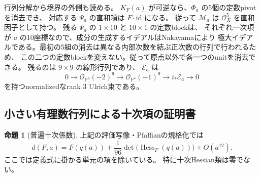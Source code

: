 \documentclass[a4paper,11pt]{ltjsarticle}
\theoremstyle{definition}
\newtheorem{theorem}{命題}[section]
\newcommand{\OO}{\mathcal O}
\newcommand{\PP}{\mathbb P}
\begin{document}
行列分解から境界の外側も読める。
$K_F(a)$ が可逆なら、$\Phi_a$ の5個の定数pivotを消去でき、
対応する $\Psi_a$ の直和項は $F\cdot\mathrm{id}$ になる。
従って $\mathcal M_a$ は $\OO_X^5$ を直和因子として持つ。
残る $\Psi_a$ の $1\times10$ と $10\times1$ の定数blockは、
それぞれ一次項が $a$ の10座標なので、成分の生成するイデアルはNakayamaにより
極大イデアルである。最初の5組の消去は異なる内部次数を結ぶ正次数の行列で行われるため、
この二つの定数blockを変えない。従って原点以外で各一つのunitを消去できる。
残るのは $9\times9$ の線形行列であり、
$\mathcal E_a$ は
\[
 0\longrightarrow\OO_{\PP^4}(-2)^9
 \longrightarrow\OO_{\PP^4}(-1)^9
 \longrightarrow i_*\mathcal E_a\longrightarrow0
\]
を持つnormalizedなrank 3 Ulrich束である。

\subsection{小さい有理数行列による十次項の証明書}

\begin{theorem}[普遍十次係数]\label{thm:tate-tenth-coefficient}
上記の評価写像・Pfaffianの規格化では
\[
 \boxed{\displaystyle
 d(F,a)=F(q(a))+\frac1{96}\det\bigl(\operatorname{Hess}_F(q(a))\bigr)
       +O(a^{12}).}
 \tag{T9}\label{eq:tate-tenth-coefficient}
\]
ここでは定義式に掛かる単元の項を除いている。
特に十次Hessian類は零でない。
\end{theorem}
\end{document}
